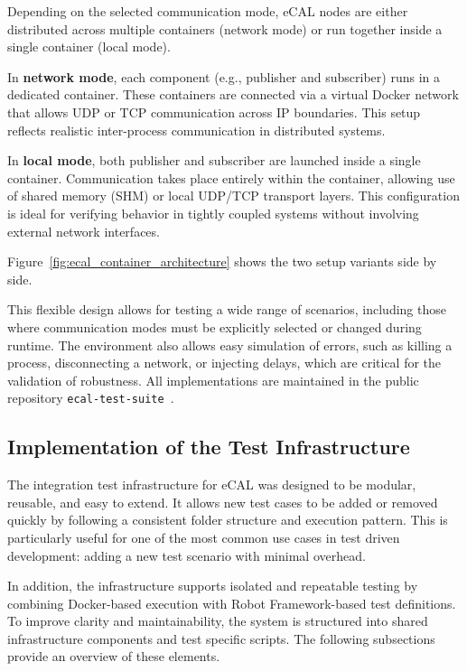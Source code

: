 Depending on the selected communication mode, eCAL nodes are either distributed across multiple containers (network mode) or run together inside a single container (local mode). 

\vspace{1em}
In \textbf{network mode}, each component (e.g., publisher and subscriber) runs in a dedicated container. These containers are connected via a virtual Docker network that allows UDP or TCP communication across IP boundaries. This setup reflects realistic inter-process communication in distributed systems.

\vspace{1em}
In \textbf{local mode}, both publisher and subscriber are launched inside a single container. Communication takes place entirely within the container, allowing use of shared memory (SHM) or local UDP/TCP transport layers. This configuration is ideal for verifying behavior in tightly coupled systems without involving external network interfaces.

\vspace{1em}
Figure~\ref{fig:ecal_container_architecture} shows the two setup variants side by side.

\vspace{1em}
This flexible design allows for testing a wide range of scenarios, including those where communication modes must be explicitly selected or changed during runtime. The environment also allows easy simulation of errors, such as killing a process, disconnecting a network, or injecting delays, which are critical for the validation of robustness. All implementations are maintained in the public repository \texttt{ecal-test-suite}~\cite{ecal_test_suite_repo}.

\subsection{Implementation of the Test Infrastructure}

The integration test infrastructure for eCAL was designed to be modular, reusable, and easy to extend. It allows new test cases to be added or removed quickly by following a consistent folder structure and execution pattern. This is particularly useful for one of the most common use cases in test driven development: adding a new test scenario with minimal overhead.

\vspace{1em}
In addition, the infrastructure supports isolated and repeatable testing by combining Docker-based execution with Robot Framework-based test definitions. To improve clarity and maintainability, the system is structured into shared infrastructure components and test specific scripts. The following subsections provide an overview of these elements.

